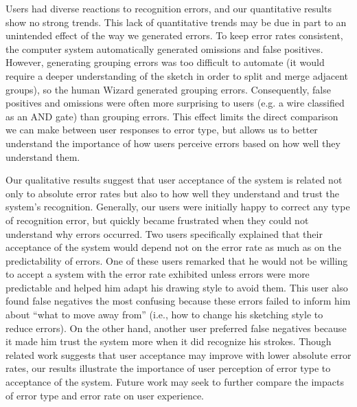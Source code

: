 \documentclass{egpubl}
\begin{document}
Users had diverse reactions to recognition errors, and our
quantitative results show no strong trends.  This lack of quantitative
trends may be due in part to an unintended effect of the way we
generated errors.  To keep error rates consistent, the computer system
automatically generated omissions and false positives.  However,
generating grouping errors was too difficult to automate (it would
require a deeper understanding of the sketch in order to split and
merge adjacent groups), so the human Wizard generated grouping errors.
Consequently, false positives and omissions were often more surprising
to users (e.g. a wire classified as an AND gate) than grouping errors.
This effect limits the direct comparison we can make between user
responses to error type, but allows us to better understand the
importance of how users perceive errors based on how well they
understand them.

Our qualitative results suggest that user acceptance of the system is
related not only to absolute error rates but also to how well they
understand and trust the system's recognition.  Generally, our users
were initially happy to correct any type of recognition error, but
quickly became frustrated when they could not understand why errors
occurred.  Two users specifically explained that their acceptance of
the system would depend not on the error rate as much as on the
predictability of errors.  One of these users remarked that he would not be
willing to accept a system with the error rate exhibited unless errors
were more predictable and helped him adapt his drawing style to avoid
them.  This user also found false negatives the most confusing because
these errors failed to inform him about ``what to move away from''
(i.e., how to change his sketching style to reduce errors).  On the
other hand, another user preferred false negatives because it made him
trust the system more when it did recognize his strokes.  Though related 
work suggests that user acceptance may improve with lower absolute error
rates, our results illustrate the importance of user perception of 
error type to acceptance of the system.  Future work may seek to further 
compare the impacts of error type and error rate on user experience.  

\end{document}
